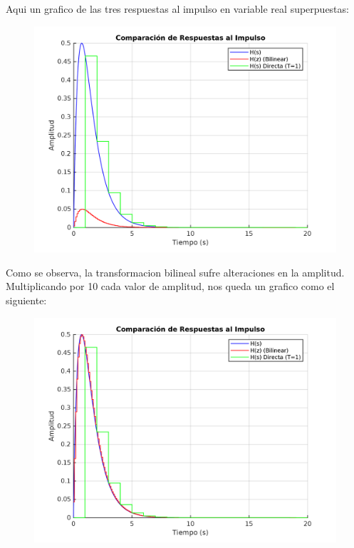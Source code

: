 \documentclass[a4paper,12pt]{report}
\begin{document}
\begin{enumerate}[label=\alph*), left=0pt]
                Aqui un grafico de las tres respuestas al impulso en variable real superpuestas:
                \begin{figure}[h]
                    \centering
                    \includegraphics[width=1\textwidth]{./images/image1.png}
                \end{figure}

                Como se observa, la transformacion bilineal sufre alteraciones en la amplitud. Multiplicando por 10
                cada valor de amplitud, nos queda un grafico como el siguiente:
                \begin{figure}[h]
                    \centering
                    \includegraphics[width=1\textwidth]{./images/image2.png}
                \end{figure}


\end{enumerate}
\end{document}
